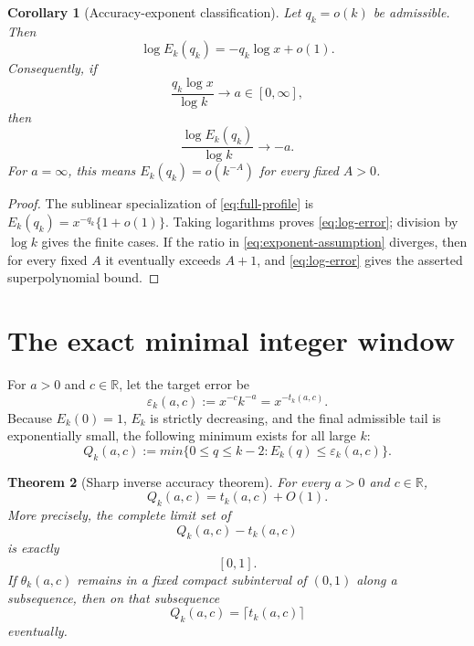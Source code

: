 \documentclass[11pt]{article}
\newtheorem{theorem}{Theorem}[section]
\newtheorem{corollary}[theorem]{Corollary}
\theoremstyle{remark}
\begin{document}
\begin{corollary}[Accuracy-exponent classification]\label{cor:exponent}
Let $q_k=o(k)$ be admissible.  Then
\begin{equation}\label{eq:log-error}
 \log E_k(q_k)=-q_k\log x+o(1).
\end{equation}
Consequently, if
\begin{equation}\label{eq:exponent-assumption}
 \frac{q_k\log x}{\log k}\longrightarrow a\in[0,\infty],
\end{equation}
then
\begin{equation}\label{eq:exponent-law}
 \frac{\log E_k(q_k)}{\log k}\longrightarrow-a.
\end{equation}
For $a=\infty$, this means $E_k(q_k)=o(k^{-A})$ for every fixed $A>0$.
\end{corollary}

\begin{proof}
The sublinear specialization of \eqref{eq:full-profile} is
$E_k(q_k)=x^{-q_k}\{1+o(1)\}$.  Taking logarithms proves
\eqref{eq:log-error}; division by $\log k$ gives the finite cases.  If the
ratio in \eqref{eq:exponent-assumption} diverges, then for every fixed $A$
it eventually exceeds $A+1$, and \eqref{eq:log-error} gives the asserted
superpolynomial bound.
\end{proof}

\section{The exact minimal integer window}

For $a>0$ and $c\in\mathbb R$, let the target error be
\begin{equation}\label{eq:target}
 \varepsilon_k(a,c):=x^{-c}k^{-a}=x^{-t_k(a,c)}.
\end{equation}
Because $E_k(0)=1$, $E_k$ is strictly decreasing, and the final admissible
tail is exponentially small, the following minimum exists for all large
$k$:
\begin{equation}\label{eq:Q}
 Q_k(a,c):=min\{0\le q\le k-2:E_k(q)\le\varepsilon_k(a,c)\}.
\end{equation}

\begin{theorem}[Sharp inverse accuracy theorem]\label{thm:inverse}
For every $a>0$ and $c\in\mathbb R$,
\begin{equation}\label{eq:Q-first}
 Q_k(a,c)=t_k(a,c)+O(1).
\end{equation}
More precisely, the complete limit set of
\begin{equation}\label{eq:Q-correction}
 Q_k(a,c)-t_k(a,c)
\end{equation}
is exactly
\begin{equation}\label{eq:Q-cluster}
 \boxed{[0,1].}
\end{equation}
If $\theta_k(a,c)$ remains in a fixed compact subinterval of $(0,1)$ along a
subsequence, then on that subsequence
\begin{equation}\label{eq:generic-ceiling}
 Q_k(a,c)=\lceil t_k(a,c)\rceil
\end{equation}
eventually.
\end{theorem}
\end{document}
